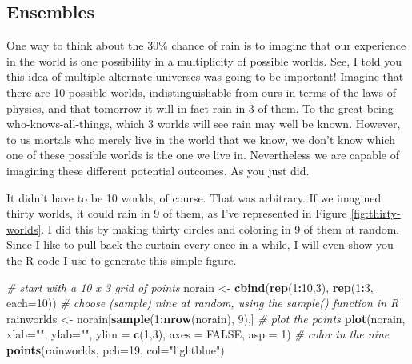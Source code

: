 \documentclass[openany]{book}
\newenvironment{Shaded}{\begin{snugshade}}{\end{snugshade}}
\newcommand{\CommentTok}[1]{\textcolor[rgb]{0.56,0.35,0.01}{\textit{#1}}}
\newcommand{\DataTypeTok}[1]{\textcolor[rgb]{0.13,0.29,0.53}{#1}}
\newcommand{\DecValTok}[1]{\textcolor[rgb]{0.00,0.00,0.81}{#1}}
\newcommand{\KeywordTok}[1]{\textcolor[rgb]{0.13,0.29,0.53}{\textbf{#1}}}
\newcommand{\NormalTok}[1]{#1}
\newcommand{\OperatorTok}[1]{\textcolor[rgb]{0.81,0.36,0.00}{\textbf{#1}}}
\newcommand{\OtherTok}[1]{\textcolor[rgb]{0.56,0.35,0.01}{#1}}
\newcommand{\StringTok}[1]{\textcolor[rgb]{0.31,0.60,0.02}{#1}}
\begin{document}
\hypertarget{ensembles}{%
\subsection*{Ensembles}\label{ensembles}}

One way to think about the 30\% chance of rain is to imagine that our experience in the world is one possibility in a multiplicity of possible worlds. See, I told you this idea of multiple alternate universes was going to be important! Imagine that there are 10 possible worlds, indistinguishable from ours in terms of the laws of physics, and that tomorrow it will in fact rain in 3 of them. To the great being-who-knows-all-things, which 3 worlds will see rain may well be known. However, to us mortals who merely live in the world that we know, we don't know which one of these possible worlds is the one we live in. Nevertheless we are capable of imagining these different potential outcomes. As you just did.

It didn't have to be 10 worlds, of course. That was arbitrary. If we imagined thirty worlds, it could rain in 9 of them, as I've represented in Figure \ref{fig:thirty-worlds}. I did this by making thirty circles and coloring in 9 of them at random. Since I like to pull back the curtain every once in a while, I will even show you the R code I use to generate this simple figure.

\begin{Shaded}
\begin{Highlighting}[]
\CommentTok{# start with a 10 x 3 grid of points}
\NormalTok{norain <-}\StringTok{ }\KeywordTok{cbind}\NormalTok{(}\KeywordTok{rep}\NormalTok{(}\DecValTok{1}\OperatorTok{:}\DecValTok{10}\NormalTok{,}\DecValTok{3}\NormalTok{), }\KeywordTok{rep}\NormalTok{(}\DecValTok{1}\OperatorTok{:}\DecValTok{3}\NormalTok{, }\DataTypeTok{each=}\DecValTok{10}\NormalTok{))  }
\CommentTok{# choose (sample) nine at random, using the sample() function in R}
\NormalTok{rainworlds <-}\StringTok{ }\NormalTok{norain[}\KeywordTok{sample}\NormalTok{(}\DecValTok{1}\OperatorTok{:}\KeywordTok{nrow}\NormalTok{(norain), }\DecValTok{9}\NormalTok{),]  }
\CommentTok{# plot the points}
\KeywordTok{plot}\NormalTok{(norain, }\DataTypeTok{xlab=}\StringTok{""}\NormalTok{, }\DataTypeTok{ylab=}\StringTok{""}\NormalTok{, }\DataTypeTok{ylim =} \KeywordTok{c}\NormalTok{(}\DecValTok{1}\NormalTok{,}\DecValTok{3}\NormalTok{), }\DataTypeTok{axes =} \OtherTok{FALSE}\NormalTok{, }\DataTypeTok{asp =} \DecValTok{1}\NormalTok{) }
\CommentTok{# color in the nine}
\KeywordTok{points}\NormalTok{(rainworlds, }\DataTypeTok{pch=}\DecValTok{19}\NormalTok{, }\DataTypeTok{col=}\StringTok{"lightblue"}\NormalTok{) }
\end{Highlighting}
\end{Shaded}
\end{document}
